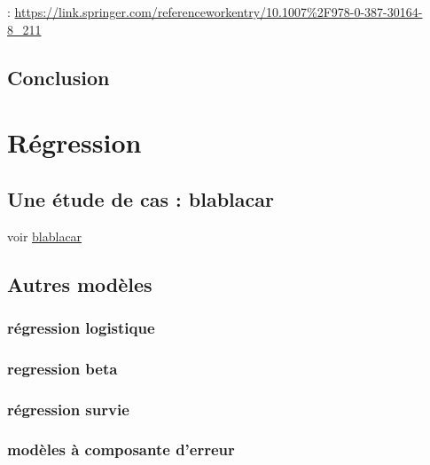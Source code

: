 \documentclass[
]{book}
\begin{document}
: \url{https://link.springer.com/referenceworkentry/10.1007\%2F978-0-387-30164-8_211}

\hypertarget{conclusion}{%
\section{Conclusion}\label{conclusion}}

\hypertarget{ruxe9gression}{%
\chapter{Régression}\label{ruxe9gression}}

\hypertarget{une-uxe9tude-de-cas-blablacar}{%
\section{Une étude de cas : blablacar}\label{une-uxe9tude-de-cas-blablacar}}

voir \href{https://github.com/BenaventC/Covoiturage}{blablacar}

\hypertarget{autres-moduxe8les}{%
\section{Autres modèles}\label{autres-moduxe8les}}

\hypertarget{ruxe9gression-logistique}{%
\subsection{régression logistique}\label{ruxe9gression-logistique}}

\hypertarget{regression-beta}{%
\subsection{regression beta}\label{regression-beta}}

\hypertarget{ruxe9gression-survie}{%
\subsection{régression survie}\label{ruxe9gression-survie}}

\hypertarget{moduxe8les-uxe0-composante-derreur}{%
\subsection{modèles à composante d'erreur}\label{moduxe8les-uxe0-composante-derreur}}
\end{document}
